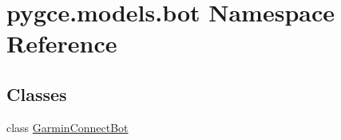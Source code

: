 \hypertarget{namespacepygce_1_1models_1_1bot}{}\section{pygce.\+models.\+bot Namespace Reference}
\label{namespacepygce_1_1models_1_1bot}
\subsection*{Classes}
\begin{DoxyCompactItemize}
\item 
class \hyperlink{classpygce_1_1models_1_1bot_1_1_garmin_connect_bot}{Garmin\+Connect\+Bot}
\end{DoxyCompactItemize}
